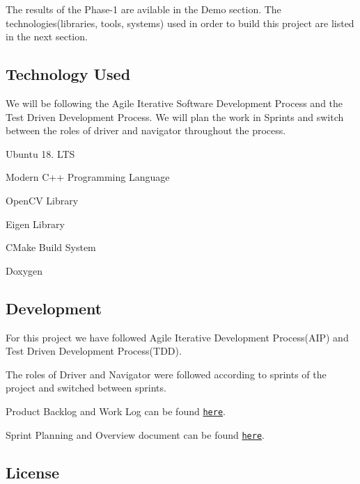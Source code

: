 The results of the Phase-\/1 are avilable in the Demo section. The technologies(libraries, tools, systems) used in order to build this project are listed in the next section.

\subsection*{Technology Used}

We will be following the Agile Iterative Software Development Process and the Test Driven Development Process. We will plan the work in Sprints and switch between the roles of driver and navigator throughout the process.


\begin{DoxyItemize}
\item Ubuntu 18. L\+TS
\item Modern C++ Programming Language
\item Open\+CV Library
\item Eigen Library
\item C\+Make Build System
\item Doxygen
\end{DoxyItemize}

\subsection*{Development}


\begin{DoxyItemize}
\item For this project we have followed Agile Iterative Development Process(\+A\+I\+P) and Test Driven Development Process(\+T\+D\+D).
\item The roles of Driver and Navigator were followed according to sprints of the project and switched between sprints.
\item Product Backlog and Work Log can be found \href{https://docs.google.com/spreadsheets/d/1bapR4zMCzfcwQHhxAm6KktWsMINTTPEt/edit#gid=2052063551}{\tt here}.
\item Sprint Planning and Overview document can be found \href{https://docs.google.com/document/d/1Xaz2rZ7OrmSh3bSE351XQz483VGetJkJdF37AjUF9Ro/edit}{\tt here}.
\end{DoxyItemize}

\subsection*{License}


